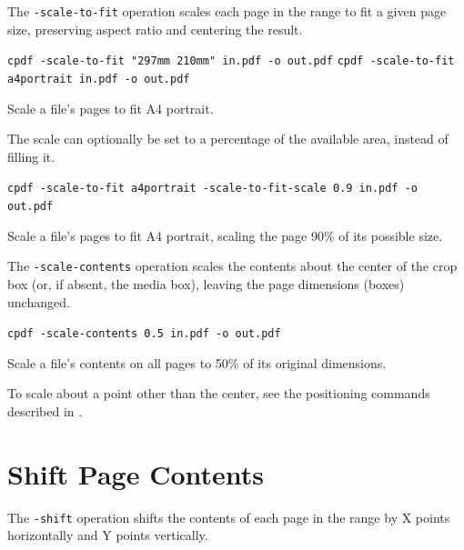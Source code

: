 \documentclass[a4paper,makeidx]{memoir}
\begin{document}
  \noindent The \texttt{-scale-to-fit} operation scales each page in the range to fit a
  given page size, preserving aspect ratio and centering the result.

  \begin{framed}
  \small\noindent\verb!cpdf -scale-to-fit "297mm 210mm" in.pdf -o out.pdf!
  \small\noindent\verb!cpdf -scale-to-fit a4portrait in.pdf -o out.pdf!

  \vspace{2.5mm}
  \noindent Scale a file's pages to fit A4 portrait.
  \end{framed}

  \noindent The scale can optionally be set to a percentage of the available area, instead of filling it.
  \begin{framed}
  \small\noindent\verb!cpdf -scale-to-fit a4portrait -scale-to-fit-scale 0.9 in.pdf -o out.pdf!

  \vspace{2.5mm}
  \noindent Scale a file's pages to fit A4 portrait, scaling the page 90\% of its possible size.
  \end{framed}

  \noindent The \texttt{-scale-contents} operation scales the contents about the center
  of the crop box (or, if absent, the media box), leaving the page dimensions
  (boxes) unchanged.

  \begin{framed}
  \small\noindent\verb!cpdf -scale-contents 0.5 in.pdf -o out.pdf!

  \vspace{2.5mm}
  \noindent Scale a file's contents on all pages to 50\% of its original dimensions.
  \end{framed}

  \noindent To scale about a point other than the center, see the positioning commands described in .

  \section{Shift Page Contents}

  The \texttt{-shift} operation shifts the contents of each page in the range
by X points horizontally and Y points vertically.
\end{document}
